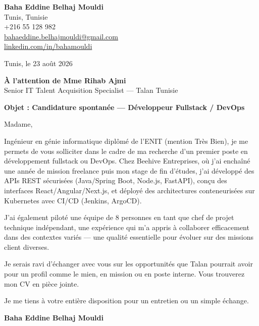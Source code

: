 \documentclass[a4paper,11pt]{article}
\begin{document}
\begin{flushright}
{\bfseries Baha Eddine Belhaj Mouldi}\\
Tunis, Tunisie\\
+216 55 128 982\\
\href{mailto:bahaeddine.belhajmouldi@gmail.com}{bahaeddine.belhajmouldi@gmail.com}\\
\href{https://linkedin.com/in/bahamouldi}{linkedin.com/in/bahamouldi}
\end{flushright}
\vspace{0.8cm}
\begin{flushleft}
Tunis, le 23 ao\^ut 2026
\vspace{0.8cm}

{\bfseries \`A l'attention de Mme Rihab Ajmi}\\
Senior IT Talent Acquisition Specialist --- Talan Tunisie
\vspace{0.6cm}

{\bfseries Objet : Candidature spontan\'ee --- D\'eveloppeur Fullstack / DevOps}
\end{flushleft}
\vspace{0.6cm}
Madame,

Ing\'enieur en g\'enie informatique dipl\^om\'e de l'ENIT (mention Tr\`es Bien), je me permets de vous solliciter dans le cadre de ma recherche d'un premier poste en d\'eveloppement fullstack ou DevOps. Chez Beehive Entreprises, o\`u j'ai encha\^in\'e une ann\'ee de mission freelance puis mon stage de fin d'\'etudes, j'ai d\'evelopp\'e des APIs REST s\'ecuris\'ees (Java/Spring Boot, Node.js, FastAPI), con\c cu des interfaces React/Angular/Next.js, et d\'eploy\'e des architectures conteneuris\'ees sur Kubernetes avec CI/CD (Jenkins, ArgoCD).

J'ai \'egalement pilot\'e une \'equipe de 8 personnes en tant que chef de projet technique ind\'ependant, une exp\'erience qui m'a appris \`a collaborer efficacement dans des contextes vari\'es --- une qualit\'e essentielle pour \'evoluer sur des missions client diverses.

Je serais ravi d'\'echanger avec vous sur les opportunit\'es que Talan pourrait avoir pour un profil comme le mien, en mission ou en poste interne. Vous trouverez mon CV en pi\`ece jointe.

Je me tiens \`a votre enti\`ere disposition pour un entretien ou un simple \'echange.

\vspace{0.8cm}
\begin{flushright}
{\bfseries Baha Eddine Belhaj Mouldi}
\end{flushright}
\end{document}
